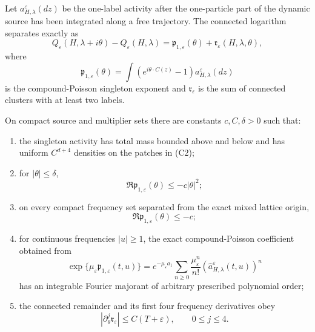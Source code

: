 Let \(a_{H,\lambda}^\varepsilon(dz)\) be the one-label activity after the
one-particle part of the dynamic source has been integrated along a free
trajectory.  The connected logarithm separates exactly as
\[
Q_\varepsilon(H,\lambda+i\theta)-Q_\varepsilon(H,\lambda)
=\mathfrak p_{1,\varepsilon}(\theta)
+\mathfrak r_\varepsilon(H,\lambda,\theta),
\]
where
\[
\mathfrak p_{1,\varepsilon}(\theta)=
\int\left(e^{i\theta\cdot C(z)}-1\right)
 a_{H,\lambda}^\varepsilon(dz)
\]
is the compound-Poisson singleton exponent and
\(\mathfrak r_\varepsilon\) is the sum of connected clusters with at least
two labels.

\begin{lemma}
\label{lem:r6-b1-poisson}
On compact source and multiplier sets there are constants
\(c,C,\delta>0\) such that:
\begin{enumerate}[label=(\roman*)]
\item the singleton activity has total mass bounded above and below and has
uniform \(C^{d+4}\) densities on the patches in (C2);
\item for \(|\theta|\le\delta\),
\[
\Re\mathfrak p_{1,\varepsilon}(\theta)
\le-c|\theta|^2;
\]
\item on every compact frequency set separated from the exact mixed lattice
origin,
\[
\Re\mathfrak p_{1,\varepsilon}(\theta)\le-c;
\]
\item for continuous frequencies \(|u|\ge1\), the exact compound-Poisson
coefficient obtained from
\[
\exp\{\mu_\varepsilon\mathfrak p_{1,\varepsilon}(t,u)\}
=e^{-\mu_\varepsilon a_1}
\sum_{n\ge0}\frac{\mu_\varepsilon^n}{n!}
\left(\widehat a_{H,\lambda}^\varepsilon(t,u)\right)^n
\]
has an integrable Fourier majorant of arbitrary prescribed polynomial order;
\item the connected remainder and its first four frequency derivatives obey
\[
|\partial_\theta^j\mathfrak r_\varepsilon|
\le C(T+\varepsilon),
\qquad 0\le j\le4.
\]
\end{enumerate}
\end{lemma}

